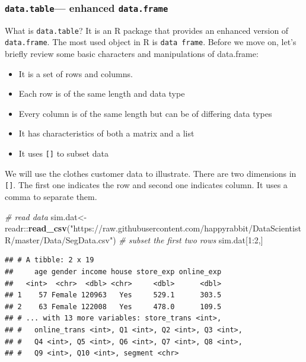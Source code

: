 \documentclass[12pt,]{krantz}
\newenvironment{Shaded}{\begin{snugshade}}{\end{snugshade}}
\newcommand{\KeywordTok}[1]{\textcolor[rgb]{0.13,0.29,0.53}{\textbf{{#1}}}}
\newcommand{\DecValTok}[1]{\textcolor[rgb]{0.00,0.00,0.81}{{#1}}}
\newcommand{\StringTok}[1]{\textcolor[rgb]{0.31,0.60,0.02}{{#1}}}
\newcommand{\CommentTok}[1]{\textcolor[rgb]{0.56,0.35,0.01}{\textit{{#1}}}}
\newcommand{\NormalTok}[1]{{#1}}
\providecommand{\tightlist}{%
  \setlength{\itemsep}{0pt}\setlength{\parskip}{0pt}}
\theoremstyle{definition}
\theoremstyle{definition}
\theoremstyle{remark}
\begin{document}
\subsubsection{\texorpdfstring{\texttt{data.table}--- enhanced
\texttt{data.frame}}{data.table--- enhanced data.frame}}\label{data.table-enhanced-data.frame}

What is \texttt{data.table}? It is an R package that provides an
enhanced version of \texttt{data.frame}. The most used object in R is
\texttt{data\ frame}. Before we move on, let's briefly review some basic
characters and manipulations of data.frame:

\begin{itemize}
\tightlist
\item
  It is a set of rows and columns.
\item
  Each row is of the same length and data type
\item
  Every column is of the same length but can be of differing data types
\item
  It has characteristics of both a matrix and a list
\item
  It uses \texttt{{[}{]}} to subset data
\end{itemize}

We will use the clothes customer data to illustrate. There are two
dimensions in \texttt{{[}{]}}. The first one indicates the row and
second one indicates column. It uses a comma to separate them.

\begin{Shaded}
\begin{Highlighting}[]
\CommentTok{# read data}
\NormalTok{sim.dat<-readr::}\KeywordTok{read_csv}\NormalTok{(}\StringTok{"https://raw.githubusercontent.com/happyrabbit/DataScientistR/master/Data/SegData.csv"}\NormalTok{)}
\CommentTok{# subset the first two rows}
\NormalTok{sim.dat[}\DecValTok{1}\NormalTok{:}\DecValTok{2}\NormalTok{,]}
\end{Highlighting}
\end{Shaded}

\begin{verbatim}
## # A tibble: 2 x 19
##     age gender income house store_exp online_exp
##   <int>  <chr>  <dbl> <chr>     <dbl>      <dbl>
## 1    57 Female 120963   Yes     529.1      303.5
## 2    63 Female 122008   Yes     478.0      109.5
## # ... with 13 more variables: store_trans <int>,
## #   online_trans <int>, Q1 <int>, Q2 <int>, Q3 <int>,
## #   Q4 <int>, Q5 <int>, Q6 <int>, Q7 <int>, Q8 <int>,
## #   Q9 <int>, Q10 <int>, segment <chr>
\end{verbatim}
\end{document}
